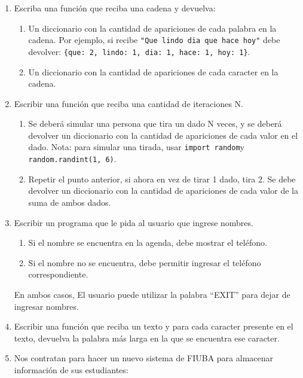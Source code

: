 \documentclass[
  letterpaper,
  DIV=11,
  numbers=noendperiod]{scrreprt}
\providecommand{\tightlist}{%
  \setlength{\itemsep}{0pt}\setlength{\parskip}{0pt}}\usepackage{longtable,booktabs,array}
\begin{document}
\begin{enumerate}
\def\labelenumi{\arabic{enumi}.}
\setcounter{enumi}{1}
\item
  Escriba una función que reciba una cadena y devuelva:

  \begin{enumerate}
  \def\labelenumii{\alph{enumii}.}
  \tightlist
  \item
    Un diccionario con la cantidad de apariciones de cada palabra en la
    cadena. Por ejemplo, si recibe
    \texttt{"Que\ lindo\ dia\ que\ hace\ hoy"} debe devolver:
    \texttt{\{\textquotesingle{}que\textquotesingle{}:\ 2,\ \textquotesingle{}lindo\textquotesingle{}:\ 1,\ \textquotesingle{}dia\textquotesingle{}:\ 1,\ \textquotesingle{}hace\textquotesingle{}:\ 1,\ \textquotesingle{}hoy\textquotesingle{}:\ 1\}}.
  \item
    Un diccionario con la cantidad de apariciones de cada caracter en la
    cadena.
  \end{enumerate}
\item
  Escribir una función que reciba una cantidad de iteraciones N.

  \begin{enumerate}
  \def\labelenumii{\alph{enumii}.}
  \item
    Se deberá simular una persona que tira un dado N veces, y se deberá
    devolver un diccionario con la cantidad de apariciones de cada valor
    en el dado. Nota: para simular una tirada, usar
    \texttt{import\ random}y \texttt{random.randint(1,\ 6)}.
  \item
    Repetir el punto anterior, si ahora en vez de tirar 1 dado, tira 2.
    Se debe devolver un diccionario con la cantidad de apariciones de
    cada valor de la suma de ambos dados.
  \end{enumerate}
\item
  Escribir un programa que le pida al usuario que ingrese nombres.

  \begin{enumerate}
  \def\labelenumii{\alph{enumii}.}
  \tightlist
  \item
    Si el nombre se encuentra en la agenda, debe mostrar el teléfono.
  \item
    Si el nombre no se encuentra, debe permitir ingresar el teléfono
    correspondiente.
  \end{enumerate}

  En ambos casos, El usuario puede utilizar la palabra ``EXIT'' para
  dejar de ingresar nombres.
\item
  Escribir una función que reciba un texto y para cada caracter presente
  en el texto, devuelva la palabra más larga en la que se encuentra ese
  caracter.
\item
  Nos contratan para hacer un nuevo sistema de FIUBA para almacenar
  información de sus estudiantes:


\end{enumerate}
\end{document}
